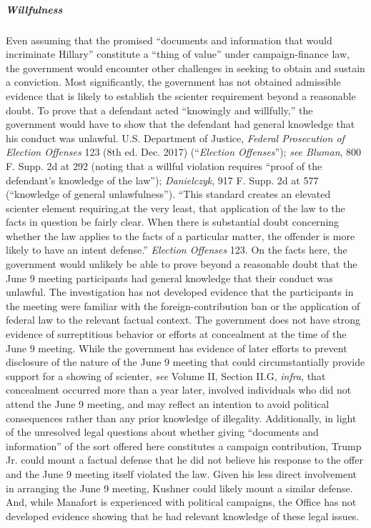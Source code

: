 \subparagraph{Willfulness}
Even assuming that the promised ``documents and information that would incriminate Hillary'' constitute a ``thing of value'' under campaign-finance law, the government would encounter other challenges in seeking to obtain and sustain a conviction.
Most significantly, the government has not obtained admissible evidence that is likely to establish the scienter requirement beyond a reasonable doubt.
To prove that a defendant acted ``knowingly and willfully,'' the government would have to show that the defendant had general knowledge that his conduct was unlawful.
U.S. Department of Justice, \textit{Federal Prosecution of Election Offenses} 123 (8th ed. Dec. 2017) (``\textit{Election Offenses}''); \textit{see Bluman}, 800 F. Supp. 2d at 292 (noting that a willful violation requires ``proof of the defendant's knowledge of the law''); \textit{Danielczyk}, 917 F. Supp. 2d at 577 (``knowledge of general unlawfulness'').
``This standard creates an elevated scienter element requiring,at the very least, that application of the law to the facts in question be fairly clear.
When there is substantial doubt concerning whether the law applies to the facts of a particular matter, the offender is more likely to have an intent defense.''
\textit{Election Offenses} 123.
On the facts here, the government would unlikely be able to prove beyond a reasonable doubt that the June 9 meeting participants had general knowledge that their conduct was unlawful.
The investigation has not developed evidence that the participants in the meeting were familiar with the foreign-contribution ban or the application of federal law to the relevant factual context.
The government does not have strong evidence of surreptitious behavior or efforts at concealment at the time of the June 9 meeting.
While the government has evidence of later efforts to prevent disclosure of the nature of the June 9 meeting that could circumstantially provide support for a showing of scienter, \textit{see} Volume II, Section II.G, \textit{infra}, that concealment occurred more than a year later, involved individuals who did not attend the June 9 meeting, and may reflect an intention to avoid political consequences rather than any prior knowledge of illegality.
Additionally, in light of the unresolved legal questions about whether giving ``documents and information'' of the sort offered here constitutes a campaign contribution, Trump Jr. could mount a factual defense that he did not believe his response to the offer and the June 9 meeting itself violated the law.
Given his less direct involvement in arranging the June 9 meeting, Kushner could likely mount a similar defense.
And, while Manafort is experienced with political campaigns, the Office has not developed evidence showing that he had relevant knowledge of these legal issues.

